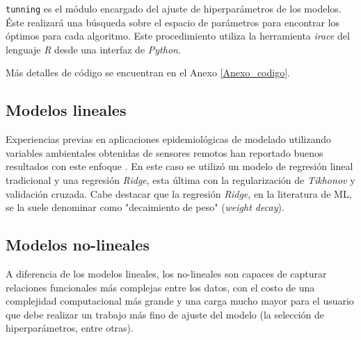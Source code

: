         \par \verb|tunning| es el módulo encargado del ajuste de hiperparámetros
          de los modelos. Éste realizará una búsqueda sobre el espacio de
          parámetros para encontrar los óptimos para cada algoritmo. Este
          procedimiento utiliza la herramienta \textit{irace} del lenguaje
          \textit{R} desde una interfaz de \textit{Python}.

        \par Más detalles de código se encuentran en el Anexo \ref{Anexo_codigo}.



    \subsection{Modelos lineales}

      \par Experiencias previas en aplicaciones epidemiológicas de
        modelado utilizando variables ambientales obtenidas de sensores
        remotos han reportado buenos resultados con este
        enfoque \cite{akodon_modeling, multilinear_apli, modis_data}.
        En este caso se utilizó un modelo de regresión lineal tradicional y
        una regresión \textit{Ridge}, esta última con la regularización de
        \textit{Tikhonov} y validación cruzada. Cabe destacar que la
        regresión \textit{Ridge}, en la literatura de ML, se la suele denominar
        como "decaimiento de peso" (\textit{weight decay}\cite{weight_decay}).

  \subsection{Modelos no-lineales}

    \par A diferencia de los modelos lineales, los no-lineales son capaces de
      capturar relaciones funcionales más complejas entre los datos, con el costo
      de una complejidad computacional más grande y una carga mucho mayor para el
      usuario que debe realizar un trabajo más fino de ajuste del modelo (la
      selección de hiperparámetros, entre otras).

